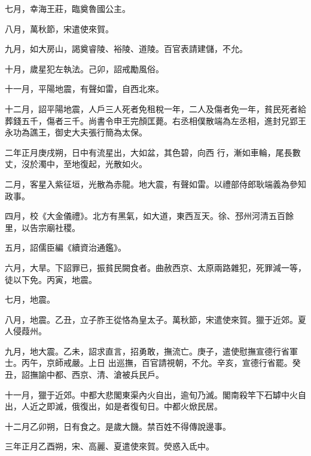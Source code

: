 \begin{pinyinscope}
 七月，幸海王莊，臨奠魯國公主。



 八月，萬秋節，宋遣使來賀。



 九月，如大房山，謁奠睿陵、裕陵、道陵。百官表請建儲，不允。



 十月，歲星犯左執法。己卯，詔戒勵風俗。



 十一月，平陽地震，有聲如雷，自西北來。



 十二月，詔平陽地震，人戶三人死者免租稅一年，二人及傷者免一年，貧民死者給葬錢五千，傷者三千。尚書令申王完顏匡薨。右丞相僕散端為左丞相，進封兄郢王永功為譙王，御史大夫張行簡為太保。



 二年正月庚戌朔，日中有流星出，大如盆，其色碧，向西
 行，漸如車輪，尾長數丈，沒於濁中，至地復起，光散如火。



 二月，客星入紫征垣，光散為赤龍。地大震，有聲如雷。以禮部侍郎耿端義為參知政事。



 四月，校《大金儀禮》。北方有黑氣，如大道，東西亙天。徐、邳州河清五百餘里，以告宗廟社稷。



 五月，詔儒臣編《續資治通鑑》。



 六月，大旱。下詔罪已，振貧民闕食者。曲赦西京、太原兩路雜犯，死罪減一等，徒以下免。丙寅，地震。



 七月，地震。



 八月，地震。乙丑，立子胙王從恪為皇太子。萬秋節，宋遣使來賀。獵于近郊。夏人侵葭州。



 九月，地大震。乙未，詔求直言，招勇敢，撫流亡。庚子，遣使慰撫宣德行省軍士。丙午，京師戒嚴。上日
 出巡撫，百官請視朝，不允。辛亥，宣德行省罷。癸丑，詔撫諭中都、西京、清、滄被兵民戶。



 十一月，獵于近郊。中都大悲閣東渠內火自出，逾旬乃滅。閣南殺竿下石罅中火自出，人近之即滅，俄復出，如是者復旬日。中都火焮民居。



 十二月乙卯朔，日有食之。是歲大饑。禁百姓不得傳說邊事。



 三年正月乙酉朔，宋、高麗、夏遣使來賀。熒惑入氐中。




\end{pinyinscope}
